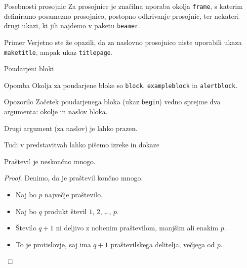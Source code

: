 \begin{frame}{Posebnosti prosojnic}
    Za prosojnice je značilna uporaba okolja \texttt{frame}, s katerim
    definiramo posamezno prosojnico, postopno odkrivanje prosojnic,
    \pause{}
    ter nekateri drugi ukazi, ki jih najdemo v paketu \texttt{beamer}.
    \pause{}

    \begin{exampleblock}{Primer}
        Verjetno ste že opazili, da za naslovno prosojnico niste uporabili
        ukaza \texttt{maketitle}, ampak ukaz \texttt{titlepage}.
    \end{exampleblock}
\end{frame}

\begin{frame}{Poudarjeni bloki}
    \begin{block}{Opomba}
        Okolja za poudarjene bloke so \texttt{block},
        \texttt{exampleblock} in \texttt{alertblock}.
    \end{block}

    \begin{alertblock}{Opozorilo}
        Začetek poudarjenega bloka (ukaz \texttt{begin}) vedno sprejme
        dva argumenta: okolje in naslov bloka.

        Drugi argument (za naslov) je lahko prazen.
    \end{alertblock}
\end{frame}

\begin{frame}{Tudi v predstavitvah lahko pišemo izreke in dokaze}
    \begin{izrek}
        Praštevil je neskončno mnogo.
    \end{izrek}

    \begin{proof}
        Denimo, da je praštevil končno mnogo.

        \begin{itemize}[<+->]
            \item Naj bo \(p\) \alert<4>{največje} praštevilo.
            \item Naj bo \(q\) produkt števil \(1\), \(2\), \ldots, \(p\).
            \item Število \(q+1\) ni deljivo z nobenim praštevilom,
                  manjšim ali enakim \(p\).
            \item To je protislovje, saj ima \(q+1\)
                  praštevilskega delitelja, večjega od \(p\). \qedhere
        \end{itemize}
    \end{proof}
\end{frame}
